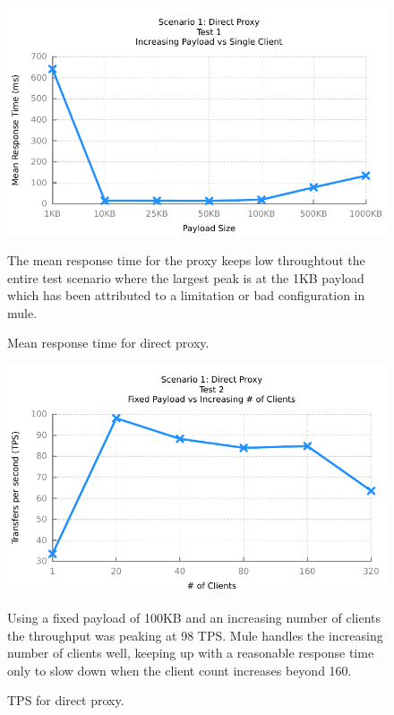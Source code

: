 \begin{figure}[H]
	\caption{Mean response time for direct proxy.}
	\centerline{\includegraphics{img/proxy_fu_ip_resp}}
	\label{fig:proxy-1-2}
	The mean response time for the proxy keeps low throughtout the entire test scenario where the largest peak is at the 1KB payload which has been attributed to a limitation or bad configuration in mule.
\end{figure}


\begin{figure}[H]
	\caption{TPS for direct proxy.}
	\centerline{\includegraphics{img/proxy_fp_iu_tps}}
	\label{fig:proxy-2-1}
	Using a fixed payload of 100KB and an increasing number of clients the throughput was peaking at 98 TPS. Mule handles the increasing number of clients well, keeping up with a reasonable response time only to slow down when the client count increases beyond 160.
\end{figure}

